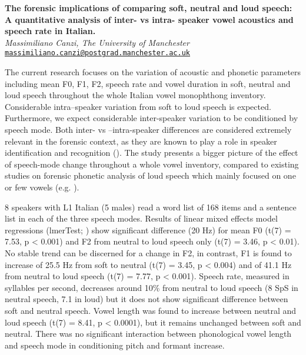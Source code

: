 \documentclass[12pt,a4paper]{article}
\newcommand\email[1]{{\tt\href{mailto:#1}{#1}}} %
\begin{document}
\raggedbottom
\begin{center}
\textbf{The forensic implications of comparing soft, neutral and loud speech: A quantitative analysis of inter- vs intra- speaker vowel acoustics and speech rate in Italian.}\\
\vspace{0.5em}
\textit{Massimiliano Canzi, The University of Manchester}
\vspace{0.25em}
\email{massimiliano.canzi@postgrad.manchester.ac.uk}
\end{center}

The current research focuses on the variation of acoustic and phonetic parameters including mean F0, F1, F2, speech rate and vowel duration in soft, neutral and loud speech throughout the whole Italian vowel monophthong inventory. Considerable intra–speaker variation from soft to loud speech is expected. Furthermore, we expect considerable inter-speaker variation to be conditioned by speech mode. Both inter- vs –intra-speaker differences are considered extremely relevant in the forensic context, as they are known to play a role in speaker identification and recognition (\citealt{Remez-1997}). The study presents a bigger picture of the effect of speech-mode change throughout a whole vowel inventory, compared to existing studies on forensic phonetic analysis of loud speech which mainly focused on one or few vowels (e.g. \citealt{Elliot-2000}). 

8 speakers with L1 Italian (5 males) read a word list of 168 items and a sentence list in each of the three speech modes. Results of linear mixed effects model regressions (lmerTest; \citealt{Kuznetsova-2015}) show significant difference (20 Hz) for mean F0 (t(7) = 7.53, p < 0.001) and F2 from neutral to loud speech only (t(7) = 3.46, p < 0.01). No stable trend can be discerned for a change in F2, in contrast, F1 is found to increase of 25.5 Hz from soft to neutral (t(7) = 3.45, p < 0.004) and of 41.1 Hz from neutral to loud speech (t(7) = 7.77, p < 0.001). Speech rate, measured in syllables per second, decreases around 10\% from neutral to loud speech (8 SpS in neutral speech, 7.1 in loud) but it does not show significant difference between soft and neutral speech. Vowel length was found to increase between neutral and loud speech (t(7) = 8.41, p < 0.0001), but it remains unchanged between soft  and neutral. There was no significant interaction between phonological vowel length and speech mode in conditioning pitch and formant increase. 
\end{document}
